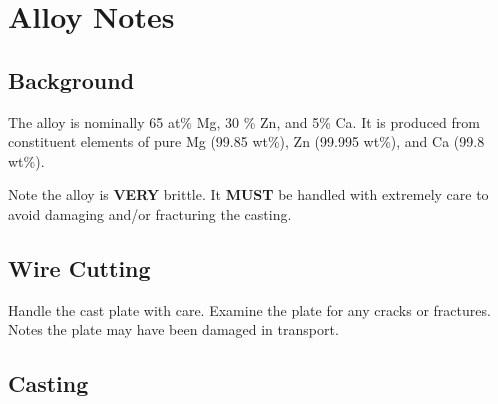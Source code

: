\section{\MgZnCa Alloy Notes}

\subsection{Background}

The \MgZnCa alloy is nominally 65 at\% Mg, 30 \% Zn, and 5\% Ca. It is produced from constituent elements of pure Mg (99.85 wt\%), Zn (99.995 wt\%), and Ca (99.8 wt\%). 

Note the \MgZnCa alloy is \textbf{VERY} brittle. It \textbf{MUST} be handled with extremely care to avoid damaging and/or fracturing the casting.

\subsection{Wire Cutting}
Handle the cast plate with care. 
Examine the plate for any cracks or fractures. Notes the plate may have been damaged in transport. 

\subsection{Casting}


